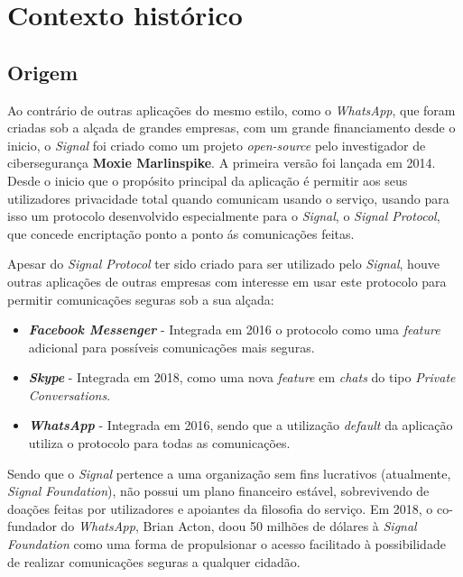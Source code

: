 
\section{Contexto histórico}

\subsection{Origem}     %
Ao contrário de outras aplicações do mesmo estilo, como o \textit{WhatsApp}, que foram criadas sob a alçada de grandes empresas, com um grande financiamento desde o inicio, o \textit{Signal} foi criado como um projeto \textit{open-source} pelo investigador de cibersegurança \textbf{Moxie Marlinspike}. A primeira versão foi lançada em 2014. Desde o inicio que o propósito principal da aplicação é permitir aos seus utilizadores privacidade total quando comunicam usando o serviço, usando para isso um protocolo desenvolvido especialmente para o \textit{Signal}, o \textit{Signal Protocol}, que concede encriptação ponto a ponto ás comunicações feitas.

Apesar do \textit{Signal Protocol} ter sido criado para ser utilizado pelo \textit{Signal}, houve outras aplicações de outras empresas com interesse em usar este protocolo para permitir comunicações seguras sob a sua alçada:

\begin{itemize}
   \item \textbf{\textit{Facebook Messenger}} - Integrada em 2016 o protocolo como uma \textit{feature} adicional para possíveis comunicações mais seguras.
   
   \item \textbf{\textit{Skype}} - Integrada em 2018, como uma nova \textit{feature} em \textit{chats} do tipo \textit{Private Conversations}.
   
   \item \textbf{\textit{WhatsApp}} - Integrada em 2016, sendo que a utilização \textit{default} da aplicação utiliza o protocolo para todas as comunicações. 
\end{itemize}

Sendo que o \textit{Signal} pertence a uma organização sem fins lucrativos (atualmente, \textit{Signal Foundation}), não possui um plano financeiro estável, sobrevivendo de doações feitas por utilizadores e apoiantes da filosofia do serviço. Em 2018, o co-fundador do \textit{WhatsApp}, Brian Acton, doou 50 milhões de dólares à \textit{Signal Foundation} como uma forma de propulsionar o acesso facilitado à possibilidade de realizar comunicações seguras a qualquer cidadão. \cite{history}


